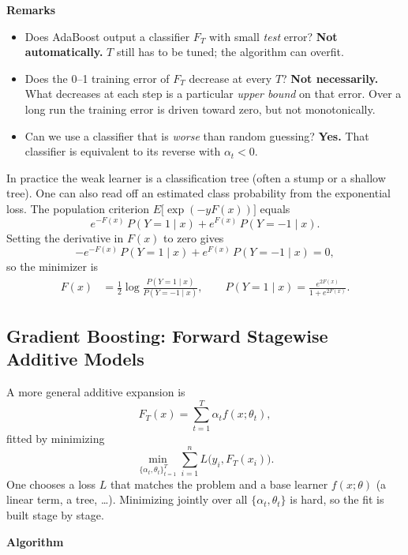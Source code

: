 \documentclass[
]{book}
\providecommand{\tightlist}{%
  \setlength{\itemsep}{0pt}\setlength{\parskip}{0pt}}
\begin{document}
\vspace{0.6em}

\textbf{Remarks}

\begin{itemize}
\tightlist
\item
  Does AdaBoost output a classifier \(F_T\) with small \emph{test} error? \textbf{Not automatically.} \(T\) still has to be tuned; the algorithm can overfit.
\item
  Does the 0--1 training error of \(F_T\) decrease at every \(T\)? \textbf{Not necessarily.} What decreases at each step is a particular \emph{upper bound} on that error. Over a long run the training error is driven toward zero, but not monotonically.
\item
  Can we use a classifier that is \emph{worse} than random guessing? \textbf{Yes.} That classifier is equivalent to its reverse with \(\alpha_t < 0\).
\end{itemize}

In practice the weak learner is a classification tree (often a stump or a shallow tree). One can also read off an estimated class probability from the exponential loss. The population criterion \(E\bigl[\exp(-y F(x))\bigr]\) equals
\[
e^{-F(x)}\, P(Y=1\mid x) + e^{F(x)}\, P(Y=-1\mid x).
\]
Setting the derivative in \(F(x)\) to zero gives
\[
-e^{-F(x)}\, P(Y=1\mid x) + e^{F(x)}\, P(Y=-1\mid x) = 0,
\]
so the minimizer is
\begin{align*}
F(x)
&=
\frac12 \log \frac{P(Y=1\mid x)}{P(Y=-1\mid x)},
\qquad
P(Y=1\mid x)
=
\frac{e^{2F(x)}}{1+e^{2F(x)}}.
\end{align*}

\vspace{1.2em}

\subsection{Gradient Boosting: Forward Stagewise Additive Models}\label{gradient-boosting-forward-stagewise-additive-models}

A more general additive expansion is
\[
F_T(x) = \sum_{t=1}^{T} \alpha_t f(x; \theta_t),
\]
fitted by minimizing
\[
\min_{\{\alpha_t,\theta_t\}_{t=1}^{T}}
\sum_{i=1}^{n} L\bigl(y_i, F_T(x_i)\bigr).
\]
One chooses a loss \(L\) that matches the problem and a base learner \(f(x;\theta)\) (a linear term, a tree, \ldots). Minimizing jointly over all \(\{\alpha_t,\theta_t\}\) is hard, so the fit is built stage by stage.

\textbf{Algorithm}
\end{document}
